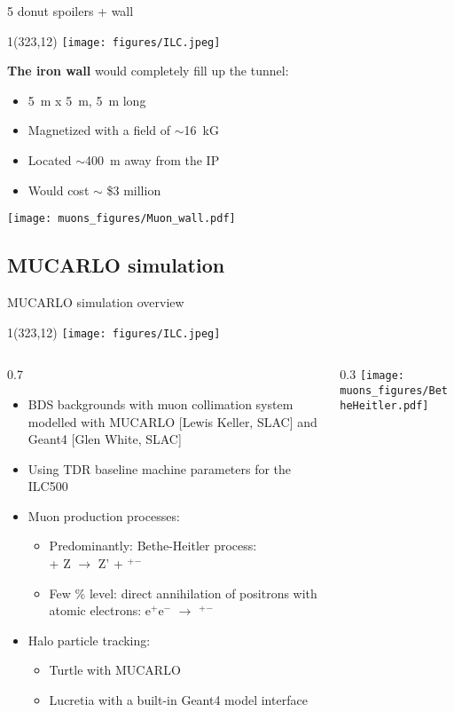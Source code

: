 \documentclass[xcolor={dvipsnames}]{beamer}
\newcommand{\ilclogo}{
  \setlength{\TPHorizModule}{1pt}
  \setlength{\TPVertModule}{1pt}
  \begin{textblock}{1}(323,12)
   \texttt{[image: figures/ILC.jpeg]}
  \end{textblock}
}
\begin{document}
\begin{frame}{5 donut spoilers + wall}
\ilclogo
\textbf{The iron wall} would completely fill up the tunnel:
\begin{itemize}
 \item \SI{5}{m} x \SI{5}{m}, \SI{5}{m} long
 \item Magnetized with a field of $\sim$\SI{16}{kG}
 \item Located $\sim$\SI{400}{m} away from the IP
 \item Would cost $\sim$ \$3 million
\end{itemize}
\begin{center}
\texttt{[image: muons\_figures/Muon\_wall.pdf]}
\end{center}
\end{frame}

\setcounter{tocdepth}{3}
\subsection{MUCARLO simulation}
\begin{frame}{MUCARLO simulation overview}
\ilclogo

\begin{columns}
 \begin{column}{0.7\textwidth}
  \begin{itemize}
\item BDS backgrounds with muon collimation system modelled with MUCARLO [Lewis Keller, SLAC] and Geant4 [Glen White, SLAC]
\item Using TDR baseline machine parameters for the ILC500
\item Muon production processes:
\begin{itemize}
\item Predominantly: Bethe-Heitler process:\\ \textgamma + Z $\rightarrow$ Z' + \textmu$^+$\textmu$^-$
\item Few \% level: direct annihilation of positrons with atomic electrons: e$^+$e$^-$ $\rightarrow$ \textmu$^+$\textmu$^-$
\end{itemize}
\item Halo particle tracking:
\begin{itemize}
\item Turtle with MUCARLO
\item Lucretia with a built-in Geant4 model interface
\end{itemize}
\end{itemize}

 \end{column}
 \begin{column}{0.3\textwidth}
  \texttt{[image: muons\_figures/BetheHeitler.pdf]}
 \end{column}
\end{columns}
\end{frame}
\end{document}
